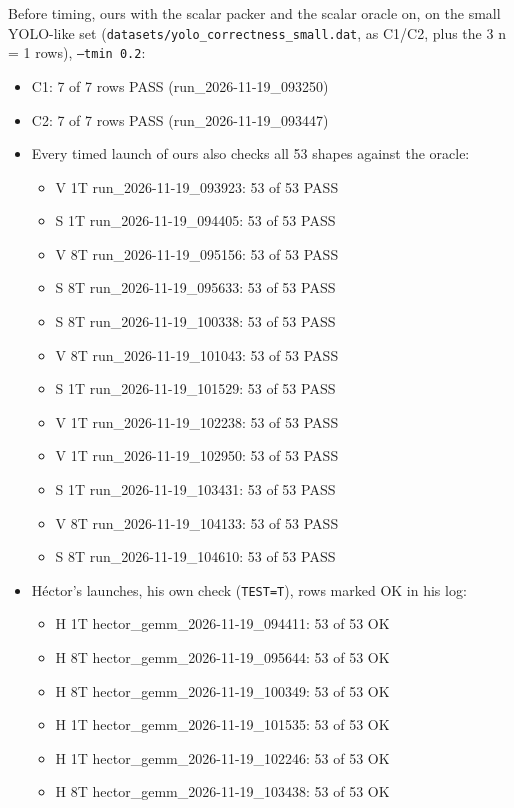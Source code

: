 Before timing, ours with the scalar packer and the scalar oracle on, on the small YOLO-like set (\texttt{datasets/yolo\_correctness\_small.dat}, as  C1/C2, plus the 3 n = 1 rows), \texttt{--tmin 0.2}:
\begin{itemize}\setlength\itemsep{0pt}
\item C1: 7 of 7 rows PASS (run\_2026-11-19\_093250)
\item C2: 7 of 7 rows PASS (run\_2026-11-19\_093447)
\item Every timed launch of ours also checks all 53 shapes against the oracle:
\begin{itemize}\setlength\itemsep{0pt}\footnotesize
\item V 1T run\_2026-11-19\_093923: 53 of 53 PASS
\item S 1T run\_2026-11-19\_094405: 53 of 53 PASS
\item V 8T run\_2026-11-19\_095156: 53 of 53 PASS
\item S 8T run\_2026-11-19\_095633: 53 of 53 PASS
\item S 8T run\_2026-11-19\_100338: 53 of 53 PASS
\item V 8T run\_2026-11-19\_101043: 53 of 53 PASS
\item S 1T run\_2026-11-19\_101529: 53 of 53 PASS
\item V 1T run\_2026-11-19\_102238: 53 of 53 PASS
\item V 1T run\_2026-11-19\_102950: 53 of 53 PASS
\item S 1T run\_2026-11-19\_103431: 53 of 53 PASS
\item V 8T run\_2026-11-19\_104133: 53 of 53 PASS
\item S 8T run\_2026-11-19\_104610: 53 of 53 PASS
\end{itemize}
\item H\'ector's launches, his own check (\texttt{TEST=T}), rows marked OK in his log:
\begin{itemize}\setlength\itemsep{0pt}\footnotesize
\item H 1T hector\_gemm\_2026-11-19\_094411: 53 of 53 OK
\item H 8T hector\_gemm\_2026-11-19\_095644: 53 of 53 OK
\item H 8T hector\_gemm\_2026-11-19\_100349: 53 of 53 OK
\item H 1T hector\_gemm\_2026-11-19\_101535: 53 of 53 OK
\item H 1T hector\_gemm\_2026-11-19\_102246: 53 of 53 OK
\item H 8T hector\_gemm\_2026-11-19\_103438: 53 of 53 OK
\end{itemize}
\end{itemize}
